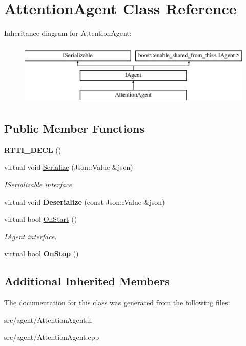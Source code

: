 \hypertarget{class_attention_agent}{}\section{Attention\+Agent Class Reference}
\label{class_attention_agent}
Inheritance diagram for Attention\+Agent\+:\begin{figure}[H]
\begin{center}
\leavevmode
\includegraphics[height=3.000000cm]{class_attention_agent}
\end{center}
\end{figure}
\subsection*{Public Member Functions}
\begin{DoxyCompactItemize}
\item 
\mbox{\label{class_attention_agent_a53613e58f92989c8be597d8114a9a40d}} 
{\bfseries R\+T\+T\+I\+\_\+\+D\+E\+CL} ()
\item 
\mbox{\label{class_attention_agent_a0f4d181576bab8f1a020564289dafbc4}} 
virtual void \hyperlink{class_attention_agent_a0f4d181576bab8f1a020564289dafbc4}{Serialize} (Json\+::\+Value \&json)
\begin{DoxyCompactList}\small\item\em I\+Serializable interface. \end{DoxyCompactList}\item 
\mbox{\label{class_attention_agent_a807fd7cf7f37552b1a2c6a0131956973}} 
virtual void {\bfseries Deserialize} (const Json\+::\+Value \&json)
\item 
\mbox{\label{class_attention_agent_a8be527fcfd664f4e68cf6984440ac83c}} 
virtual bool \hyperlink{class_attention_agent_a8be527fcfd664f4e68cf6984440ac83c}{On\+Start} ()
\begin{DoxyCompactList}\small\item\em \hyperlink{class_i_agent}{I\+Agent} interface. \end{DoxyCompactList}\item 
\mbox{\label{class_attention_agent_a55c592103072577ccf44b644288b171c}} 
virtual bool {\bfseries On\+Stop} ()
\end{DoxyCompactItemize}
\subsection*{Additional Inherited Members}


The documentation for this class was generated from the following files\+:\begin{DoxyCompactItemize}
\item 
src/agent/Attention\+Agent.\+h\item 
src/agent/Attention\+Agent.\+cpp\end{DoxyCompactItemize}
